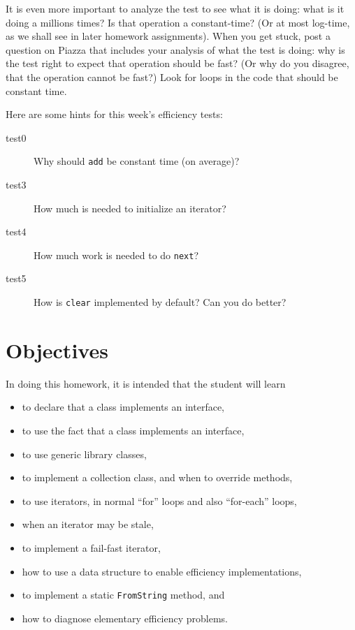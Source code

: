 \documentclass[11pt]{article}
\begin{document}
It is even more important to analyze the test to see what it is doing:
what is it doing a millions times?  Is that operation a constant-time?
(Or at most log-time, as we shall see in later homework assignments).
When you get stuck, post a question on Piazza that includes your analysis
of what the test is doing: why is the test right to expect that
operation should be fast?  (Or why do you disagree, that the operation
cannot be fast?) Look for loops in the code that should be constant time.

Here are some hints for this week's efficiency tests:
\begin{description}
\item[test0] Why should \texttt{add} be constant time (on average)?
\item[test3] How much is needed to initialize an iterator?
\item[test4] How much work is needed to do \texttt{next}?
\item[test5] How is \texttt{clear} implemented by default?  Can you
  do better?
\end{description}

\section{Objectives}

In doing this homework, it is intended that the student will learn
\begin{itemize}
\item to declare that a class implements an interface,
\item to use the fact that a class implements an interface,
\item to use generic library classes,
\item to implement a collection class, and when to override
  methods,
\item to use iterators, in normal ``for'' loops and also
  ``for-each'' loops,
\item when an iterator may be stale,
\item to implement a fail-fast iterator,
\item how to use a data structure to enable efficiency
  implementations,
\item to implement a static \texttt{FromString} method,
  and
\item how to diagnose elementary efficiency problems.
\end{itemize}
  
\end{document}
